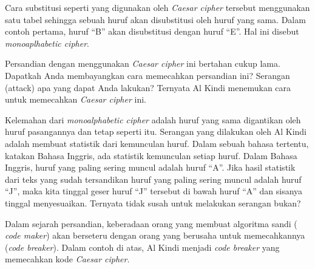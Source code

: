 Cara substitusi seperti yang digunakan oleh {\em Caesar cipher} tersebut
menggunakan satu tabel sehingga sebuah huruf akan disubstitusi oleh huruf yang
sama. Dalam contoh pertama, huruf ``B'' akan disubstitusi dengan huruf ``E''.
Hal ini disebut {\em monoaplhabetic cipher}.

Persandian dengan menggunakan {\em Caesar cipher} ini bertahan cukup lama.
Dapatkah Anda membayangkan cara memecahkan persandian ini? Serangan (attack)
apa yang dapat Anda lakukan? Ternyata Al Kindi menemukan cara untuk memecahkan
{\em Caesar cipher} ini.

Kelemahan dari {\em monoalphabetic cipher} adalah huruf yang sama digantikan
oleh huruf pasangannya dan tetap seperti itu. Serangan yang dilakukan oleh Al
Kindi adalah membuat statistik dari kemunculan huruf. Dalam sebuah bahasa
tertentu, katakan Bahasa Inggris, ada statistik kemunculan setiap huruf. Dalam
Bahasa Inggris, huruf yang paling sering muncul adalah huruf ``A''. Jika hasil
statistik dari teks yang sudah tersandikan huruf yang paling sering muncul
adalah huruf ``J'', maka kita tinggal geser huruf ``J'' tersebut di bawah huruf
``A'' dan sisanya tinggal menyesuaikan. Ternyata tidak susah untuk melakukan
serangan bukan?

\begin{mdframed}[backgroundcolor=blue!20]
\begin{ExerciseList}
   \Exercise[title=Kemunculan huruf]
\end{ExerciseList}
\end{mdframed}


Dalam sejarah persandian, keberadaan orang yang membuat algoritma sandi ({\em
code maker}) akan berseteru dengan orang yang berusaha untuk memecahkannya
({\em code breaker}). Dalam contoh di atas, Al Kindi menjadi {\em code breaker}
yang memecahkan kode {\em Caesar cipher}.


